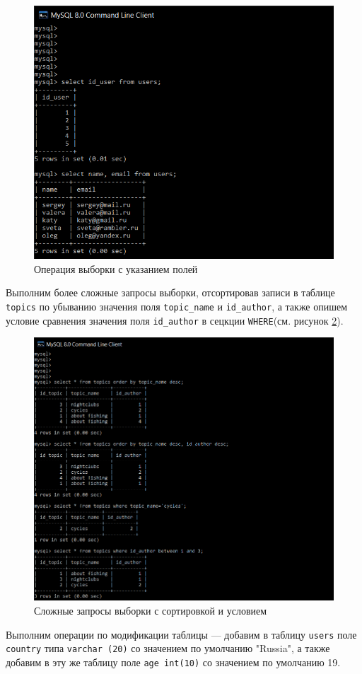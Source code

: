 \documentclass[a4paper,14pt]{extarticle}
\begin{document}
\begin{figure}[h!]
	\centering
	\includegraphics[width=0.6\linewidth]{images/field-select}
	\caption{Операция выборки с указанием полей}
	\label{fig:field-select}
\end{figure}


Выполним более сложные запросы выборки, отсортировав записи в таблице \texttt{topics} по убыванию значения поля \texttt{topic\_name} и \texttt{id\_author}, а также опишем условие сравнения значения поля \texttt{id\_author} в сецкции \texttt{WHERE}(см. рисунок \ref{fig:order-where-forum}). 

\begin{figure}[h!]
	\centering
	\includegraphics[width=0.6\linewidth]{images/order-where-forum}
	\caption{Сложные запросы выборки с сортировкой и условием}
	\label{fig:order-where-forum}
\end{figure}

Выполним операции по модификации таблицы --- добавим в таблицу \texttt{users} поле \texttt{country} типа \texttt{varchar (20)} со значением по умолчанию "Russia", а также добавим в эту же таблицу поле \texttt{age int(10)} со значением по умолчанию 19. 
\end{document}
